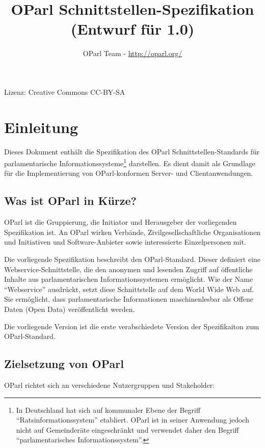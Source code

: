 \documentclass[,a4paper]{article}
\title{OParl Schnittstellen-Spezifikation (Entwurf für 1.0)}
\author{OParl Team - \url{http://oparl.org/}}
\date{}
\begin{document}
\maketitle

Lizenz: Creative Commons CC-BY-SA

\section{Einleitung}\label{einleitung}

Dieses Dokument enthält die Spezifikation des OParl
Schnittstellen-Standards für parlamentarische
Informationssysteme\footnote{In Deutschland hat sich auf kommunaler
  Ebene der Begriff ``Ratsinformationssystem'' etabliert. OParl ist in
  seiner Anwendung jedoch nicht auf Gemeinderäte eingeschränkt und
  verwendet daher den Begriff ``parlamentarisches Informationssystem''.}
darstellen. Es dient damit als Grundlage für die Implementierung von
OParl-konformen Server- und Clientanwendungen.

\subsection{Was ist OParl in Kürze?}\label{was-ist-oparl-in-kuxfcrze}

OParl ist die Gruppierung, die Initiator und Herausgeber der
vorliegenden Spezifikation ist. An OParl wirken Verbände,
Zivilgesellschaftliche Organisationen und Initiativen und
Software-Anbieter sowie interessierte Einzelpersonen mit.

Die vorliegende Spezifikation beschreibt den OParl-Standard. Dieser
definiert eine Webservice-Schnittstelle, die den anonymen und lesenden
Zugriff auf öffentliche Inhalte aus parlamentarischen
Informationssystemen ermöglicht. Wie der Name ``Webservice'' ausdrückt,
setzt diese Schnittstelle auf dem World Wide Web auf. Sie ermöglicht,
dass parlamentarische Informationen maschinenlesbar als Offene Daten
(Open Data) veröffentlicht werden.

Die vorliegende Version ist die erste verabschiedete Version der
Spezifikaiton zum OParl-Standard.

\subsection{Zielsetzung von OParl}\label{zielsetzung-von-oparl}

OParl richtet sich an verschiedene Nutzergruppen und Stakeholder:
\end{document}
